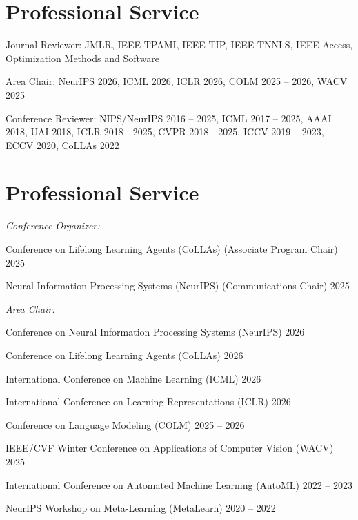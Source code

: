 \if{}
\section{\sc Professional Service}
\begin{list2}
\item Journal Reviewer: JMLR, IEEE TPAMI, IEEE TIP, IEEE TNNLS, IEEE Access, Optimization Methods and Software
\item Area Chair: NeurIPS 2026, ICML 2026, ICLR 2026, COLM 2025 -- 2026, WACV 2025
\item Conference Reviewer:  NIPS/NeurIPS 2016 -- 2025, ICML 2017 -- 2025, AAAI 2018, UAI 2018, ICLR 2018 - 2025, CVPR 2018 - 2025, ICCV 2019 -- 2023, ECCV 2020, CoLLAs 2022
\end{list2}
\else
\section{\sc Professional Service}

{\it Conference Organizer:}
\begin{list2}
\item Conference on Lifelong Learning Agents (CoLLAs) (Associate Program Chair) \hfill 2025
\item Neural Information Processing Systems (NeurIPS) (Communications Chair) \hfill 2025
\end{list2}

{\it Area Chair:}
\begin{list2}
\item Conference on Neural Information Processing Systems (NeurIPS) \hfill 2026
\item Conference on Lifelong Learning Agents (CoLLAs) \hfill 2026
\item International Conference on Machine Learning (ICML) \hfill 2026
\item International Conference on Learning Representations (ICLR) \hfill 2026
\item Conference on Language Modeling (COLM) \hfill 2025 -- 2026
\item IEEE/CVF Winter Conference on Applications of Computer Vision (WACV) \hfill 2025
\item International Conference on Automated Machine Learning (AutoML) \hfill 2022 -- 2023
\item NeurIPS Workshop on Meta-Learning (MetaLearn) \hfill 2020 -- 2022
\end{list2}

